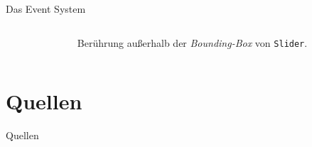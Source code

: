 \documentclass[12pt]{beamer}
\begin{document}
	\begin{frame}{Das Event System}
		\begin{columns}
			\begin{column}{0.6\textwidth}
				
			\end{column}
			\begin{column}{0.4\textwidth}
				\pause
				Berührung außerhalb der \emph{Bounding-Box} von \texttt{Slider}.
			\end{column}
		\end{columns}
		
	\end{frame}

	\section{Quellen}
	\begin{frame}{Quellen}
		\nocite{ts-holzinger}
		\nocite{stm32_refManual}
		\printbibliography
	\end{frame}
\end{document}
